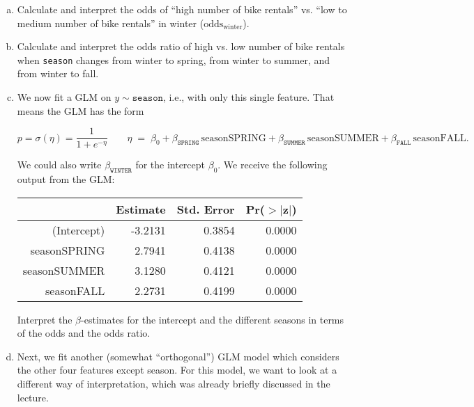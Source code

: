 {\vspace{-0.3cm}
\begin{enumerate}[a)]

	\item
    Calculate and interpret the odds of ``high number of bike rentals'' vs. ``low to medium number of bike rentals'' in winter ($\text{odds}_{\text{winter}}$).
    
	\item
    Calculate and interpret the odds ratio of high vs. low number of bike rentals when \texttt{season} changes from winter to spring, from winter to summer, and from winter to fall.
    
	\item\label{ex:logreg_GLM_single_feature}
    We now fit a GLM on $y \sim \texttt{season}$, i.e., with only this single feature.
    That means the GLM has the form

    \[
    p=\sigma(\eta)=\frac{1}{1+e^{-\eta}}
    \qquad
    \eta \;=\;
    \beta_0
    + \beta_{\texttt{SPRING}} \,\text{seasonSPRING}
    + \beta_{\texttt{SUMMER}} \,\text{seasonSUMMER}
    + \beta_{\texttt{FALL}} \,\text{seasonFALL}.
    \]

    We could also write \(\beta_{\texttt{WINTER}}\) for the intercept \(\beta_0\).
    We receive the following output from the GLM:
    
	\begin{table}[H]
		\centering
		\begin{tabular}{rrrr}
			\hline
			& Estimate & Std. Error & Pr($>$$|$z$|$) \\ 
			\hline
			(Intercept) & -3.2131 & 0.3854 & 0.0000 \\ 
			seasonSPRING & 2.7941 & 0.4138 & 0.0000 \\ 
			seasonSUMMER & 3.1280 & 0.4121 & 0.0000 \\ 
			seasonFALL & 2.2731 & 0.4199 & 0.0000 \\ 
			\hline
		\end{tabular}
	\end{table}

	Interpret the $\beta$-estimates for the intercept and the different seasons in terms of the odds and the odds ratio. 

    \item\label{ex:logreg_GLM_more_features}
    Next, we fit another (somewhat ``orthogonal'') GLM model which considers the other four features except season.
    For this model, we want to look at a different way of interpretation, which was already briefly discussed in the lecture.
    

\end{enumerate}}
